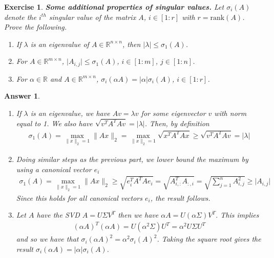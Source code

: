 \documentclass[12pt]{article}
\theoremstyle{colon}
\newtheorem{exercise}{Exercise}
\newtheorem*{answer}{Answer}
\begin{document}
\clearpage

\begin{exercise}
  \textbf{Some additional properties of singular values.} Let $\sigma_i(A)$ denote the $i^{th}$ singular value of the matrix $A$, $i \in [1:r]$ with $r = \text{rank}(A)$. Prove the following.

  \begin{enumerate}[label=\alph*)]
    \item If $\lambda$ is an eigenvalue of $A \in \mathbb{R}^{n \times n}$, then $\lvert \lambda \rvert \leq \sigma_1(A)$.
    \item For $A \in \mathbb{R}^{m \times n}$, $\lvert A_{i,j} \rvert \leq \sigma_1(A)$, $i \in [1:m]$, $ j \in [1:n]$.
    \item For $\alpha \in \mathbb{R}$ and $A \in \mathbb{R}^{m \times n}$, $\sigma_i(\alpha A) = \lvert \alpha \rvert \sigma_i(A)$, $i \in [1:r]$.
  \end{enumerate}
\end{exercise}

\begin{answer}
  \

  \begin{enumerate}[label=\alph*)]
    \item If $\lambda$ is an eigenvalue, we have $ Av = \lambda v$ for some eigenvector $v$ with norm equal to 1. We also have $\sqrt{v^T A^T A v} = \lvert \lambda \rvert$. Then, by definition
      \begin{gather*}
        \sigma_1(A) = \max_{\lVert x \rVert_2 = 1} \lVert A x \rVert_2 = \max_{\lVert x \rVert_2 = 1} \sqrt{x^T A^T A x} \geq \sqrt{v^T A^T A v} = \lvert \lambda \rvert
      \end{gather*}

    \item Doing similar steps as the previous part, we lower bound the maximum by using a canonical vector $e_i$
      \begin{gather*}
        \sigma_1(A) = \max_{\lVert x \rVert_2 = 1} \lVert A x \rVert_2 \geq \sqrt{e_i^T A^T A e_i} = \sqrt{A_{i,:}^T A_{:,i}} = \sqrt{ \sum_{j=1}^n A_{i,j}^2 } \geq \lvert A_{i,j} \rvert
      \end{gather*}
      Since this holds for all canonical vectors $e_i$, the result follows.

    \item Let $A$ have the SVD $A = U \Sigma  V^T$ then we have $\alpha A = U (\alpha \Sigma) V^T$. This implies
      \begin{gather*}
        (\alpha A)^T (\alpha A) = U (\alpha^2 \Sigma) U^T = \alpha^2 U \Sigma U^T
      \end{gather*}
      and so we have that $\sigma_i (\alpha A)^2 = \alpha^2 \sigma_i (A)^2$. Taking the square root gives the result $\sigma_i(\alpha A) = \lvert \alpha \rvert \sigma_i(A)$.
  \end{enumerate}
\end{answer}
\end{document}
